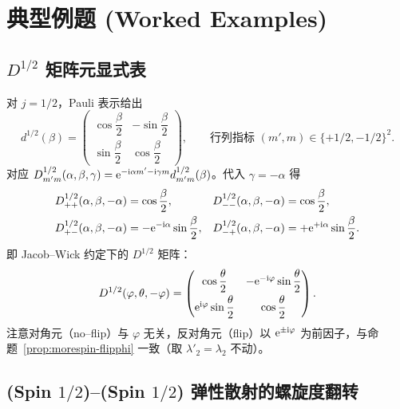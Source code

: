 \section{典型例题 (Worked Examples)}
\label{sec:morespin-examples}

\subsection{$D^{1/2}$ 矩阵元显式表}

\begin{example}[$j=1/2$ 的 Wigner $d$ 与 $D$ 函数]
\label{ex:morespin-D-half}
对 $j=1/2$，Pauli 表示给出
\begin{equation}
d^{1/2}(\beta)=
\begin{pmatrix}
\cos\dfrac{\beta}{2} & -\sin\dfrac{\beta}{2} \\[6pt]
\sin\dfrac{\beta}{2} & \cos\dfrac{\beta}{2}
\end{pmatrix},\qquad
\text{行列指标 }(m',m)\in\{+1/2,-1/2\}^2.
\label{eq:morespin-d-half}
\end{equation}
对应 $D^{1/2}_{m'm}(\alpha,\beta,\gamma)=\mathrm{e}^{-\mathrm{i}\alpha m'-\mathrm{i}\gamma m}d^{1/2}_{m'm}(\beta)$。代入 $\gamma=-\alpha$ 得
\begin{align}
D^{1/2}_{++}(\alpha,\beta,-\alpha) &= \cos\frac{\beta}{2}, &
D^{1/2}_{--}(\alpha,\beta,-\alpha) &= \cos\frac{\beta}{2}, \notag\\
D^{1/2}_{+-}(\alpha,\beta,-\alpha) &= -\mathrm{e}^{-\mathrm{i}\alpha}\sin\frac{\beta}{2}, &
D^{1/2}_{-+}(\alpha,\beta,-\alpha) &= +\mathrm{e}^{+\mathrm{i}\alpha}\sin\frac{\beta}{2}.
\label{eq:morespin-D-half-table}
\end{align}
即 Jacob--Wick 约定下的 $D^{1/2}$ 矩阵：
\begin{equation}
D^{1/2}(\varphi,\theta,-\varphi)=\begin{pmatrix} \cos\dfrac{\theta}{2} & -\mathrm{e}^{-\mathrm{i}\varphi}\sin\dfrac{\theta}{2}\\[6pt] \mathrm{e}^{\mathrm{i}\varphi}\sin\dfrac{\theta}{2} & \cos\dfrac{\theta}{2}\end{pmatrix}.
\label{eq:morespin-D-half-matrix}
\end{equation}
注意对角元（no--flip）与 $\varphi$ 无关，反对角元（flip）以 $\mathrm{e}^{\pm\mathrm{i}\varphi}$ 为前因子，与命题~\ref{prop:morespin-flipphi} 一致（取 $\lambda'_2=\lambda_2$ 不动）。
\end{example}

\subsection{(Spin $1/2$)–(Spin $1/2$) 弹性散射的螺旋度翻转}

